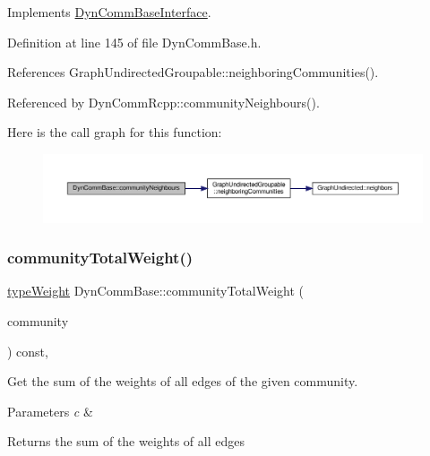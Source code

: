 Implements \hyperlink{classDynCommBaseInterface_afbae10b36098f57576378255d9c09faf}{Dyn\+Comm\+Base\+Interface}.



Definition at line 145 of file Dyn\+Comm\+Base.\+h.



References Graph\+Undirected\+Groupable\+::neighboring\+Communities().



Referenced by Dyn\+Comm\+Rcpp\+::community\+Neighbours().

Here is the call graph for this function\+:
\nopagebreak
\begin{figure}[H]
\begin{center}
\leavevmode
\includegraphics[width=350pt]{classDynCommBase_aba6f1f0fdd67a1d7f546d63706a60cde_cgraph}
\end{center}
\end{figure}
\mbox{\label{classDynCommBase_a9e7f2493dd9f2381dbfbe94b91ac49f4}} 
\subsubsection{\texorpdfstring{community\+Total\+Weight()}{communityTotalWeight()}}
{\footnotesize\ttfamily \hyperlink{edge_8h_a2e7ea3be891ac8b52f749ec73fee6dd2}{type\+Weight} Dyn\+Comm\+Base\+::community\+Total\+Weight (\begin{DoxyParamCaption}\item[{\hyperlink{graphUndirectedGroupable_8h_a914da95c9ea7f14f4b7f875c36818556}{type\+Community}}]{community }\end{DoxyParamCaption}) const\hspace{0.3cm}{\ttfamily [inline]}, {\ttfamily [virtual]}}

Get the sum of the weights of all edges of the given community.


\begin{DoxyParams}{Parameters}
{\em c} & \\
\hline
\end{DoxyParams}
\begin{DoxyReturn}{Returns}
the sum of the weights of all edges 
\end{DoxyReturn}


